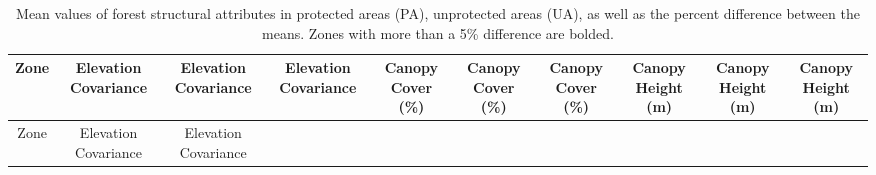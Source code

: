 \documentclass[10pt,oneside]{article}
\begin{document}
\hypertarget{tbl:vector-table}{}
\begin{longtable}[]{@{}cccccccccc@{}}
\caption{\label{tbl:vector-table}Mean values of forest structural
attributes in protected areas (PA), unprotected areas (UA), as well as
the percent difference between the means. Zones with more than a 5\%
difference are bolded.}\tabularnewline
\toprule
\begin{minipage}[b]{0.04\columnwidth}\centering
Zone\strut
\end{minipage} & \begin{minipage}[b]{0.08\columnwidth}\centering
Elevation Covariance\strut
\end{minipage} & \begin{minipage}[b]{0.08\columnwidth}\centering
Elevation Covariance\strut
\end{minipage} & \begin{minipage}[b]{0.08\columnwidth}\centering
Elevation Covariance\strut
\end{minipage} & \begin{minipage}[b]{0.07\columnwidth}\centering
Canopy Cover (\%)\strut
\end{minipage} & \begin{minipage}[b]{0.07\columnwidth}\centering
Canopy Cover (\%)\strut
\end{minipage} & \begin{minipage}[b]{0.07\columnwidth}\centering
Canopy Cover (\%)\strut
\end{minipage} & \begin{minipage}[b]{0.08\columnwidth}\centering
Canopy Height (m)\strut
\end{minipage} & \begin{minipage}[b]{0.08\columnwidth}\centering
Canopy Height (m)\strut
\end{minipage} & \begin{minipage}[b]{0.08\columnwidth}\centering
Canopy Height (m)\strut
\end{minipage}\tabularnewline
\midrule
\endfirsthead
\toprule
\begin{minipage}[b]{0.04\columnwidth}\centering
Zone\strut
\end{minipage} & \begin{minipage}[b]{0.08\columnwidth}\centering
Elevation Covariance\strut
\end{minipage} & \begin{minipage}[b]{0.08\columnwidth}\centering
Elevation Covariance\strut
\end{minipage} & \begin{minipage}[b]{0.08\columnwidth}\centering

\end{minipage}
\end{longtable}
\end{document}
